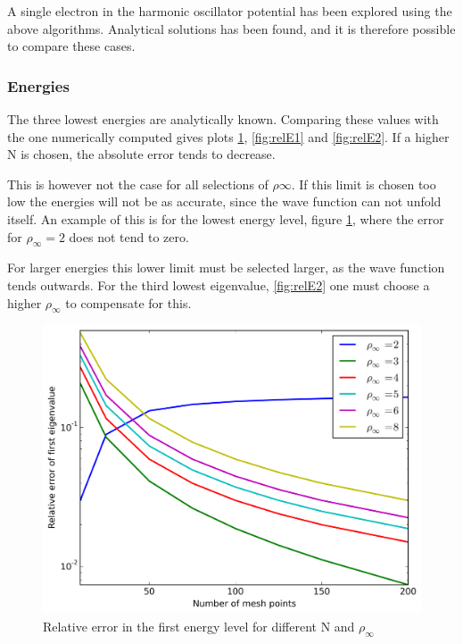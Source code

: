 \documentclass[11pt,a4paper,english,draft]{article}
\numberwithin{equation}{section}
\newcommand{\figurewidth}{.85\textwidth}
\begin{document}
A single electron in the harmonic oscillator potential has been 
explored using the above algorithms. Analytical solutions has been
found, and it is therefore possible to compare these cases.

\subsubsection{Energies}

The three lowest energies are analytically known. Comparing these values
with the one numerically computed gives plots \ref{fig:relE0}, 
\ref{fig:relE1} and \ref{fig:relE2}. If a higher N is chosen, the 
absolute error tends to decrease.

This is however not the case for all selections 
of $\rho\infty$. If this limit is chosen too low the energies will 
not be as accurate, since the wave function can not unfold itself.
An example of this is for the lowest energy level, figure \ref{fig:relE0},
where the error for $\rho_\infty = 2$ does not tend to zero.

For larger energies this lower limit must be selected larger, as the 
wave function tends outwards. For the third lowest eigenvalue, 
\ref{fig:relE2} one must choose a higher $\rho_\infty$ to compensate 
for this.


\begin{figure}
\centering
\includegraphics[width=\figurewidth]{../results/rel_logE0.png}
\caption{Relative error in the first energy level for 
different N and $\rho_\infty$}
\label{fig:relE0}
\end{figure}
\end{document}
